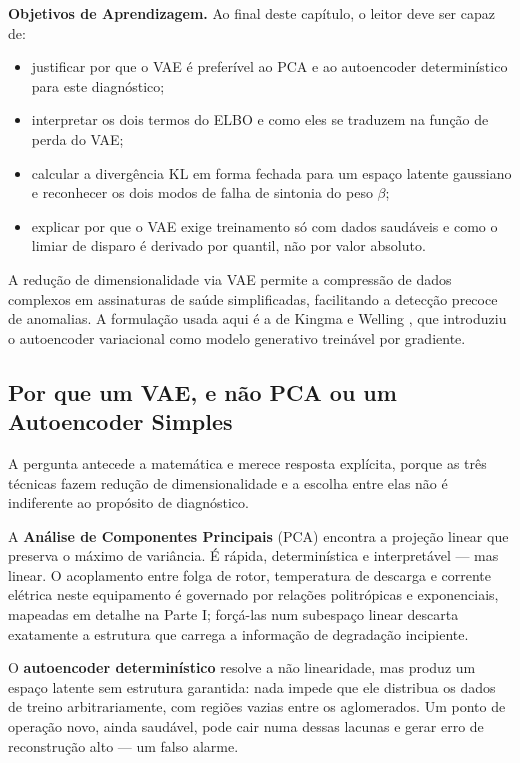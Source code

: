 \documentclass[12pt,a4paper]{article}
\numberwithin{equation}{section}
\numberwithin{table}{section}
\numberwithin{figure}{section}
\begin{document}
{	\textbf{Objetivos de Aprendizagem.} Ao final deste capítulo, o leitor
	deve ser capaz de:
	\begin{itemize}
		\item justificar por que o VAE é preferível ao PCA e ao
		autoencoder determinístico para este diagnóstico;
		\item interpretar os dois termos do ELBO e como eles se traduzem
		na função de perda do VAE;
		\item calcular a divergência KL em forma fechada para um espaço
		latente gaussiano e reconhecer os dois modos de falha de sintonia
		do peso $\beta$;
		\item explicar por que o VAE exige treinamento só com dados
		saudáveis e como o limiar de disparo é derivado por quantil, não
		por valor absoluto.
	\end{itemize}

	A redução de dimensionalidade via VAE permite a compressão de dados complexos em assinaturas de saúde simplificadas, facilitando a detecção precoce de anomalias. A formulação usada aqui é a de Kingma e Welling \cite{vae}, que introduziu o autoencoder variacional como modelo generativo treinável por gradiente.

	\subsection{Por que um VAE, e não PCA ou um Autoencoder Simples}

	A pergunta antecede a matemática e merece resposta explícita, porque as três técnicas fazem redução de dimensionalidade e a escolha entre elas não é indiferente ao propósito de diagnóstico.

	A \textbf{Análise de Componentes Principais} (PCA) encontra a projeção linear que preserva o máximo de variância. É rápida, determinística e interpretável — mas linear. O acoplamento entre folga de rotor, temperatura de descarga e corrente elétrica neste equipamento é governado por relações politrópicas e exponenciais, mapeadas em detalhe na Parte I; forçá-las num subespaço linear descarta exatamente a estrutura que carrega a informação de degradação incipiente.

	O \textbf{autoencoder determinístico} resolve a não linearidade, mas produz um espaço latente sem estrutura garantida: nada impede que ele distribua os dados de treino arbitrariamente, com regiões vazias entre os aglomerados. Um ponto de operação novo, ainda saudável, pode cair numa dessas lacunas e gerar erro de reconstrução alto — um falso alarme.

}
\end{document}
